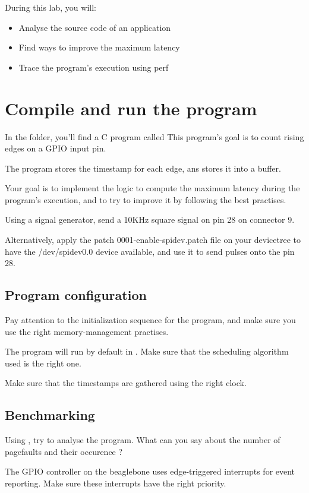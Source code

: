 
During this lab, you will:
\begin{itemize}
  \item Analyse the source code of an application
  \item Find ways to improve the maximum latency
  \item Trace the program's execution using perf
\end{itemize}

\section{Compile and run the program}

In the  folder, you'll find a C program called 
This program's goal is to count rising edges on a GPIO input pin.

The program stores the timestamp for each edge, ans stores it into a buffer.

Your goal is to implement the logic to compute the maximum latency during the
program's execution, and to try to improve it by following the best practises.

Using a signal generator, send a 10KHz square signal on pin 28 on connector 9.

Alternatively, apply the patch 0001-enable-spidev.patch file on your devicetree
to have the /dev/spidev0.0 device available, and use it to send pulses onto the
pin 28.

\subsection{Program configuration}

Pay attention to the initialization sequence for the program, and make sure you
use the right memory-management practises.

The program will run by default in . Make sure that the scheduling
algorithm used is the right one.

Make sure that the timestamps are gathered using the right clock.

\subsection{Benchmarking}

Using , try to analyse the program. What can you say about the number
of pagefaults and their occurence ?

The GPIO controller on the beaglebone uses edge-triggered interrupts for event
reporting. Make sure these interrupts have the right priority.

